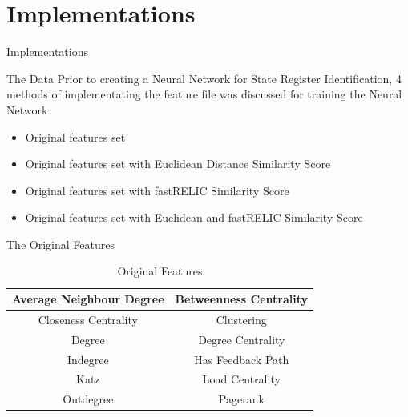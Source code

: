 \documentclass[aspectratio=169]{beamer}
\begin{document}
\section{Implementations}
\begin{frame}[c]{ }
	\begin{center}
		\Huge Implementations
	\end{center}
\end{frame}


\begin{frame}{The Data}
Prior to creating a Neural Network for State Register Identification, 4 methods of implementating the feature file was discussed for training the Neural Network
\bigskip\begin{itemize}
	\item Original features set
	\item Original features set with Euclidean Distance Similarity Score
	\item Original features set with fastRELIC Similarity Score
	\item Original features set with Euclidean and fastRELIC Similarity Score
\end{itemize}
\end{frame}

\begin{frame}{The Original Features}
\begin{table}
		\begin{tabular}{|c|c|}
		\hline
		Average Neighbour Degree & Betweenness Centrality\\
		\hline
		Closeness Centrality & Clustering\\
		\hline
		Degree & Degree Centrality\\
		\hline
		Indegree & Has Feedback Path\\
		\hline
		Katz & Load Centrality\\
		\hline
		Outdegree & Pagerank\\
		\hline
	\end{tabular}
	\caption{Original Features}
	\label{tab:Original Features}
\end{table}

\end{frame}
\end{document}
